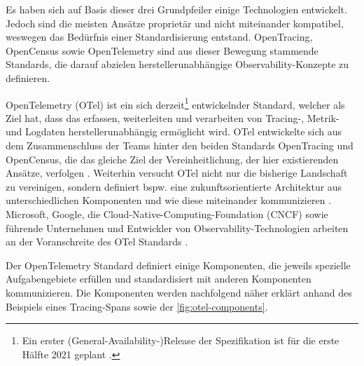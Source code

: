 
Es haben sich auf Basis dieser drei Grundpfeiler einige Technologien entwickelt. Jedoch sind die meisten Ansätze proprietär und nicht miteinander kompatibel, weswegen das Bedürfnis einer Standardisierung entstand. OpenTracing, OpenCensus \cite{OpenCensus} sowie OpenTelemetry \cite{OpenTelemetry} sind aus dieser Bewegung stammende Standards, die darauf abzielen herstellerunabhängige Observability-Konzepte zu definieren.

OpenTelemetry (OTel) ist ein sich derzeit\footnote{Ein erster (General-Availability-)Release der Spezifikation ist für die erste Hälfte 2021 geplant \cite{OpenTelemetryGARelease}.} entwickelnder Standard, welcher als Ziel hat, dass das erfassen, weiterleiten und verarbeiten von  Tracing-, Metrik- und Logdaten\footnotemark{} herstellerunabhängig ermöglicht wird. OTel entwickelte sich aus dem Zusammenschluss der Teams hinter den beiden Standards OpenTracing und OpenCensus, die das gleiche Ziel der Vereinheitlichung, der hier existierenden Ansätze, verfolgen  \cite{UseNixDistributiveTracing}. Weiterhin versucht OTel nicht nur die bisherige Landschaft zu vereinigen, sondern definiert bspw. eine zukunftsorientierte Architektur aus unterschiedlichen Komponenten und wie diese miteinander kommunizieren \cite{DistributedTracingInPractice}. Microsoft, Google, die Cloud-Native-Computing-Foundation (CNCF) sowie führende Unternehmen und Entwickler von Observability-Technologien arbeiten an der Voranschreite des OTel Standards \cite{DistributedTracingInPractice} \cite{OpenTelemetryCommunityMembers}.


Der OpenTelemetry Standard definiert einige Komponenten, die jeweils spezielle Aufgabengebiete erfüllen und standardisiert mit anderen Komponenten kommunizieren. Die Komponenten werden nachfolgend näher erklärt anhand des Beispiels eines Tracing-Spans sowie der \autoref{fig:otel-components}.

